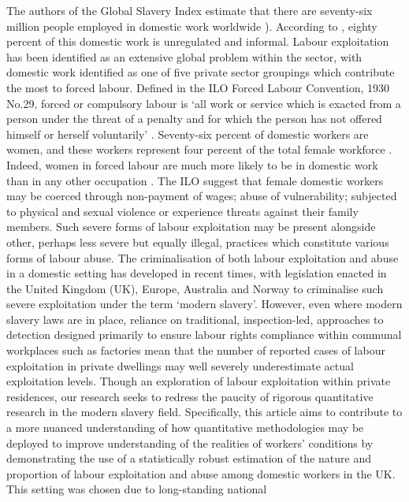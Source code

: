 \documentclass[
  12pt,
  letterpaper,
  DIV=11,
  numbers=noendperiod]{scrartcl}
\theoremstyle{plain}
\theoremstyle{definition}
\begin{document}
The authors of the Global Slavery Index estimate that there are
seventy-six million people employed in domestic work worldwide
\autocite{international_labour_organization_global_2022}).
According to \textcite{bonnet_domestic_2022}, eighty percent of this domestic work is unregulated and informal. Labour
exploitation has been identified as an extensive global problem within
the sector, with domestic work identified as one of five private sector
groupings which contribute the most to forced labour. Defined in the ILO
Forced Labour Convention, 1930 No.29, forced or compulsory labour is
`all work or service which is exacted from a person under the threat of
a penalty and for which the person has not offered himself or herself
voluntarily' \autocite{ilo_what_2024}. Seventy-six
percent of domestic workers are women, and these workers represent four
percent of the total female workforce \autocite{international_labour_organization_global_2022}. Indeed, women in forced labour are much more likely to be in domestic
work than in any other occupation \autocite{international_labour_organization_global_2022}.
The ILO suggest that female domestic workers may be coerced through
non-payment of wages; abuse of vulnerability; subjected to physical and
sexual violence or experience threats against their family members. Such
severe forms of labour exploitation may be present alongside other,
perhaps less severe but equally illegal, practices which constitute
various forms of labour abuse. The criminalisation of both labour
exploitation and abuse in a domestic setting has developed in recent
times, with legislation enacted in the United Kingdom (UK), Europe,
Australia and Norway to criminalise such severe exploitation under the
term `modern slavery'. However, even where modern slavery laws are in
place, reliance on traditional, inspection-led, approaches to detection
designed primarily to ensure labour rights compliance within communal
workplaces such as factories mean that the number of reported cases of
labour exploitation in private dwellings may well severely underestimate
actual exploitation levels. Though an exploration of labour exploitation within private residences, our research seeks to redress the paucity of rigorous quantitative research in the modern slavery field.  Specifically, this article aims to contribute to a more
nuanced understanding of how quantitative methodologies may be deployed to
improve understanding of the realities of workers' conditions by
demonstrating the use of a statistically robust estimation of the nature
and proportion of labour exploitation and abuse among domestic workers in the UK. This setting was chosen due to long-standing national
\end{document}
